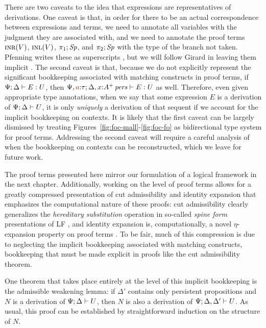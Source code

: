 There are two caveats to the idea that expressions are representatives
of derivations. One caveat is that, in order for there to be an actual
correspondence between expressions and terms, we need to annotate all
variables with the judgment they are associated with, and we need to
annotate the proof terms 
$\textsc{inr}({V})$, $\textsc{inl}({V})$, $\pi_1;{{\it Sp}}$, and $\pi_2;{{\it Sp}}$ 
with the type of the branch not taken. Pfenning writes these as
superscripts \cite{pfenning08church}, but we will follow Girard
in leaving them implicit \cite{girard89proofs}. The second caveat is
that, because we do not explicitly represent the significant
bookkeeping associated with matching constructs in proof terms, if
${\Psi}; {\Delta} \vdash {E} : {U}$, then $\foct{\Psi, \lf{a}{:}\tau}{\Delta,
  x{:}\ispers{A^+}}{E}{U}$ as well. Therefore, even given appropriate
type annotations, when we say that some expression $E$ is a derivation
of ${\Psi};{\Delta} \vdash {U} \mathstrut$, it is only {\it uniquely} a derivation of
that sequent if we account for the implicit bookkeeping on contexts.
It is likely that the first caveat can be largely dismissed by
treating Figures~\ref{fig:foc-mall}-\ref{fig:foc-fo} as bidirectional
type system for proof terms. Addressing the second caveat will
require a careful analysis of when the bookkeeping on contexts
can be reconstructed, which we leave for future work. 

The proof terms presented here mirror our formulation of a
logical framework in the next chapter.  Additionally, working on the
level of proof terms allows for a greatly compressed presentation of
cut admissibility and identity expansion that emphasizes the
computational nature of these proofs: cut admissibility clearly
generalizes the {\it hereditary substitution} operation in so-called {\it
  spine form} presentations of LF \cite{cervesato02linear}, and
identity expansion is, computationally, a novel $\eta$-expansion
property on proof terms \cite{simmons11structural}.  To be fair, much
of this compression is due to neglecting the implicit bookkeeping
associated with matching constructs, bookkeeping that must be made
explicit in proofs like the cut admissibility theorem.

One theorem that takes place entirely at the level of this implicit
bookkeeping is the admissible weakening lemma: if $\Delta'$ contains
only persistent propositions and $N$ is a derivation of
${\Psi};{\Delta} \vdash {U} \mathstrut$, then $N$ is also a derivation of
${\Psi};{\Delta, \Delta'} \vdash {U} \mathstrut$. As usual, this proof can be
established by straightforward induction on the structure of $N$.

